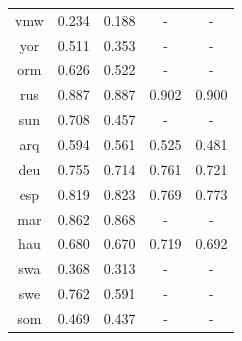 \documentclass[11pt]{article}
\begin{document}
\begin{table}[]
\begin{tabular}{ccccc}
{\color[HTML]{212121} vmw}          & {\color[HTML]{212121} 0.234} & {\color[HTML]{212121} 0.188} & -                            & -                            \\
{\color[HTML]{212121} yor}          & {\color[HTML]{212121} 0.511} & {\color[HTML]{212121} 0.353} & -                            & -                            \\
{\color[HTML]{212121} orm}          & {\color[HTML]{212121} 0.626} & {\color[HTML]{212121} 0.522} & -                            & -                            \\
{\color[HTML]{212121} rus}          & {\color[HTML]{212121} 0.887} & {\color[HTML]{212121} 0.887} & {\color[HTML]{212121} 0.902} & {\color[HTML]{212121} 0.900} \\
{\color[HTML]{212121} sun}          & {\color[HTML]{212121} 0.708} & {\color[HTML]{212121} 0.457} & -                            & -                            \\
{\color[HTML]{212121} arq}          & {\color[HTML]{212121} 0.594} & {\color[HTML]{212121} 0.561} & {\color[HTML]{212121} 0.525} & {\color[HTML]{212121} 0.481} \\
{\color[HTML]{212121} deu}          & {\color[HTML]{212121} 0.755} & {\color[HTML]{212121} 0.714} & {\color[HTML]{212121} 0.761} & {\color[HTML]{212121} 0.721} \\
{\color[HTML]{212121} esp}          & {\color[HTML]{212121} 0.819} & {\color[HTML]{212121} 0.823} & {\color[HTML]{212121} 0.769} & {\color[HTML]{212121} 0.773} \\
{\color[HTML]{212121} mar}          & {\color[HTML]{212121} 0.862} & {\color[HTML]{212121} 0.868} & -                            & -                            \\
{\color[HTML]{212121} hau}          & {\color[HTML]{212121} 0.680} & {\color[HTML]{212121} 0.670} & {\color[HTML]{212121} 0.719} & {\color[HTML]{212121} 0.692} \\
{\color[HTML]{212121} swa}          & {\color[HTML]{212121} 0.368} & {\color[HTML]{212121} 0.313} & -                            & -                            \\
{\color[HTML]{212121} swe}          & {\color[HTML]{212121} 0.762} & {\color[HTML]{212121} 0.591} & -                            & -                            \\
{\color[HTML]{212121} som}          & {\color[HTML]{212121} 0.469} & {\color[HTML]{212121} 0.437} & -                            & -                            \\

\end{tabular}
\end{table}
\end{document}
